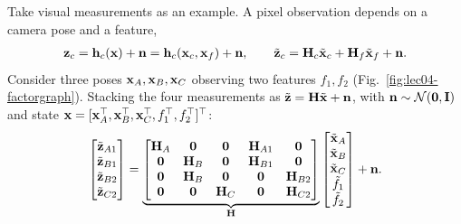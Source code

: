 Take visual measurements as an example. A pixel observation depends on a camera pose and a feature,
\begin{align}
\vect{z}_c = \vect{h}_c(\vect{x}) + \vect{n} = \vect{h}_c(\vect{x}_c,\vect{x}_f) + \vect{n}, \qquad
\tilde{\vect{z}}_c = \vect{H}_c\tilde{\vect{x}}_c + \vect{H}_f\tilde{\vect{x}}_f + \vect{n}.
\end{align}
Consider three poses $\vect{x}_A,\vect{x}_B,\vect{x}_C$ observing two features $f_1,f_2$ (Fig.~\ref{fig:lec04-factorgraph}). Stacking the four measurements as $\tilde{\vect{z}} = \vect{H}\tilde{\vect{x}} + \vect{n}$, with $\vect{n}\sim\mathcal{N}(\vect{0},\vect{I})$ and state $\vect{x} = [\vect{x}_A\trans,\vect{x}_B\trans,\vect{x}_C\trans,f_1\trans,f_2\trans]\trans$:
\begin{align}
\begin{bmatrix} \tilde{\vect{z}}_{A1} \\ \tilde{\vect{z}}_{B1} \\ \tilde{\vect{z}}_{B2} \\ \tilde{\vect{z}}_{C2} \end{bmatrix}
= \underbrace{\begin{bmatrix}
\vect{H}_A & \vect{0} & \vect{0} & \vect{H}_{A1} & \vect{0} \\
\vect{0} & \vect{H}_B & \vect{0} & \vect{H}_{B1} & \vect{0} \\
\vect{0} & \vect{H}_B & \vect{0} & \vect{0} & \vect{H}_{B2} \\
\vect{0} & \vect{0} & \vect{H}_C & \vect{0} & \vect{H}_{C2}
\end{bmatrix}}_{\vect{H}}
\begin{bmatrix} \tilde{\vect{x}}_A \\ \tilde{\vect{x}}_B \\ \tilde{\vect{x}}_C \\ \tilde f_1 \\ \tilde f_2 \end{bmatrix} + \vect{n}.
\end{align}

